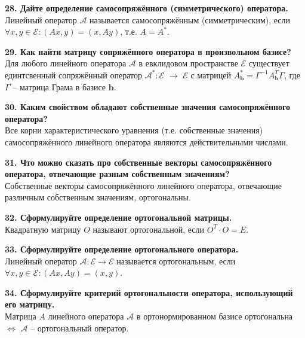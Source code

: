 \documentclass[11pt,a4paper]{article}
\renewcommand{\b}{\mathbf{b}}
\newcommand{\A}{\mathcal{A}}
\newcommand{\E}{\mathcal{E}}
\begin{document}
\textbf{28. Дайте определение самосопряжённого (симметрического) оператора.\\}
Линейный оператор $\A$ называется самосопряжённым (симметрическим), если $\forall x, y \in \E: (Ax, y) = (x, Ay)$, т.е. $A = A^*$.
\pagebreak

\textbf{29. Как найти матрицу сопряжённого оператора в произвольном базисе?\\}
Для любого линейного оператора $\A$ в евклидовом пространстве $\E$ существует единтсвенный сопряжённый оператор $\A^* : \E$ $\rightarrow$ $\E$ с матрицей $A^*_\b = \Gamma^{-1} A^T_\b \Gamma$, где $\Gamma$ -- матрица Грама в базисе $\b$.

\textbf{30. Каким свойством обладают собственные значения самосопряжённого оператора?\\}
Все корни характеристического уравнения (т.е. собственные значения) самосопряжённого линейного оператора являются действительными числами.

\textbf{31. Что можно сказать про собственные векторы самосопряжённого оператора, отвечающие разным собственным значениям?\\}
Собственные векторы самосопряжённого линейного оператора, отвечающие различным собственным значениям, ортогональны.

\textbf{32. Сформулируйте определение ортогональной матрицы.\\}
Квадратную матрицу $O$ называют ортогональной, если $O^T \cdot O = E$.

\textbf{33. Сформулируйте определение ортогонального оператора.\\}
Линейный оператор $\A : \E \rightarrow \E$ называется ортогональным, если $\forall x, y \in \E : (Ax, Ay) = (x, y)$.

\textbf{34. Сформулируйте критерий ортогональности оператора, использующий его матрицу.\\}
Матрица $A$ линейного оператора $\A$ в ортонормированном базисе ортогональна $\Leftrightarrow$ $\A$ -- ортогональный оператор.
\end{document}
